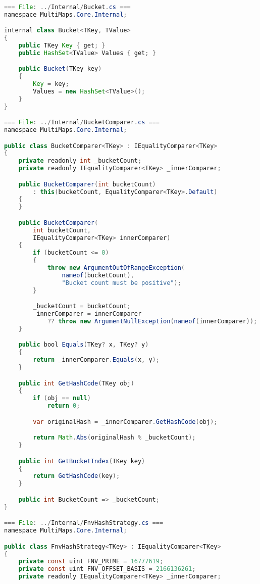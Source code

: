 \documentclass[12pt]{article}
\begin{document}
\begin{lstlisting}[language=Java]

=== File: ../Internal/Bucket.cs ===
namespace MultiMaps.Core.Internal;

internal class Bucket<TKey, TValue>
{
    public TKey Key { get; }
    public HashSet<TValue> Values { get; }

    public Bucket(TKey key)
    {
        Key = key;
        Values = new HashSet<TValue>();
    }
}

=== File: ../Internal/BucketComparer.cs ===
namespace MultiMaps.Core.Internal;

public class BucketComparer<TKey> : IEqualityComparer<TKey>
{
    private readonly int _bucketCount;
    private readonly IEqualityComparer<TKey> _innerComparer;

    public BucketComparer(int bucketCount)
        : this(bucketCount, EqualityComparer<TKey>.Default)
    {
    }

    public BucketComparer(
        int bucketCount,
        IEqualityComparer<TKey> innerComparer)
    {
        if (bucketCount <= 0)
        {
            throw new ArgumentOutOfRangeException(
                nameof(bucketCount),
                "Bucket count must be positive");
        }

        _bucketCount = bucketCount;
        _innerComparer = innerComparer
            ?? throw new ArgumentNullException(nameof(innerComparer));
    }

    public bool Equals(TKey? x, TKey? y)
    {
        return _innerComparer.Equals(x, y);
    }

    public int GetHashCode(TKey obj)
    {
        if (obj == null)
            return 0;

        var originalHash = _innerComparer.GetHashCode(obj);

        return Math.Abs(originalHash % _bucketCount);
    }

    public int GetBucketIndex(TKey key)
    {
        return GetHashCode(key);
    }

    public int BucketCount => _bucketCount;
}

=== File: ../Internal/FnvHashStrategy.cs ===
namespace MultiMaps.Core.Internal;

public class FnvHashStrategy<TKey> : IEqualityComparer<TKey>
{
    private const uint FNV_PRIME = 16777619;
    private const uint FNV_OFFSET_BASIS = 2166136261;
    private readonly IEqualityComparer<TKey> _innerComparer;


\end{lstlisting}
\end{document}
